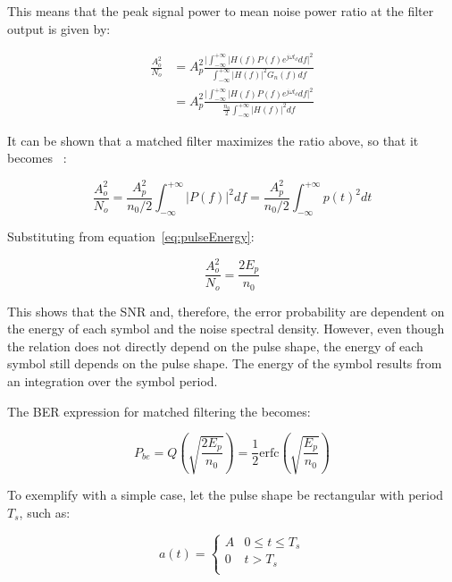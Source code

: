 \begin{refsection}
This means that the peak signal power to mean noise power ratio at the filter output is given by:

\begin{eqnarray}
\frac{A_o^2}{N_o} &= A_p^2 \frac{\big|\int_{-\infty}^{+\infty} |H(f) P(f)e^{j\omega t_d} df\big|^2}{\int_{-\infty}^{+\infty} {|H(f)|}^2 G_n(f) df}\\\nonumber
				  &= A_p^2 \frac{\big|\int_{-\infty}^{+\infty} |H(f) P(f)e^{j\omega t_d} df\big|^2}{\frac{n_0}{2}\int_{-\infty}^{+\infty} {|H(f)|}^2df}
\end{eqnarray}

It can be shown that a matched filter maximizes the ratio above, so that it becomes~\cite{carlson86} :

\begin{equation}
\frac{A_o^2}{N_o} = \frac{A_p^2}{n_0/2} \int_{-\infty}^{+\infty} |P(f)|^2 df = \frac{A_p^2}{n_0/2} \int_{-\infty}^{+\infty} p(t)^2 dt
\end{equation}

Substituting from equation~\ref{eq:pulseEnergy}:

\begin{equation}
\frac{A_o^2}{N_o} = \frac{2 E_p}{n_0}
\end{equation}

This shows that the SNR and, therefore, the error probability are dependent on
the energy of each symbol and the noise spectral density. However, even though
the relation does not directly depend on the pulse shape, the energy of each
symbol still depends on the pulse shape. The energy of the symbol results from
an integration over the symbol period.

The BER expression for matched filtering the becomes:

\begin{equation}\label{eq:berMQAMmf}
P_{be} =  Q\left(\sqrt{\frac{2 E_p}{{n_0}}}\right) = \frac{1}{2} \text{erfc}\left(\sqrt{\frac{E_p}{n_0}}\right)
\end{equation}

To exemplify with a simple case, let the pulse shape be rectangular with period $T_s$, such as:

\begin{equation*}
	a(t) = \begin{cases}
		A               & 0 \le t \le T_s\\
		0               & t > T_s\\
	\end{cases}
\end{equation*}


\end{refsection}
